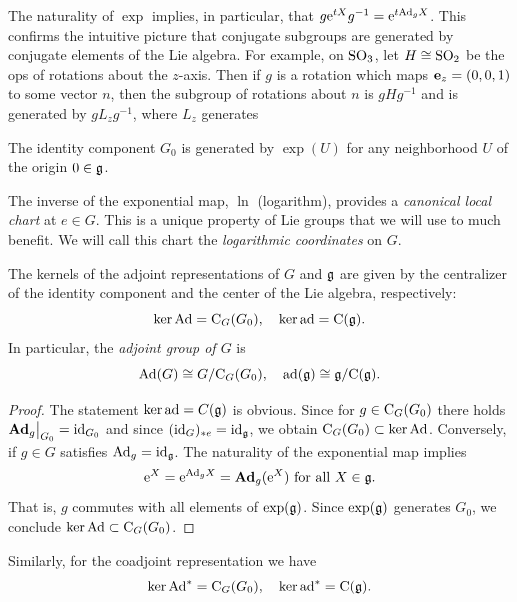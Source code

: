 \begin{rem}
    The naturality of $\exp$ implies, in particular, that $g\rme^{tX}g^{-1}=\rme^{t\Ad_g X}$. This confirms the intuitive picture that conjugate subgroups are generated by conjugate elements of the Lie algebra. For example, on $\SO_3$, let $H\cong\SO_2$ be the \gls{ops} of rotations about the $z$-axis. Then if $g$ is a rotation which maps $\bf{e}_z=(0,0,1)$ to some vector $n$, then the subgroup of rotations about $n$ is $gHg^{-1}$ and is generated by $gL_z g^{-1}$, where $L_z$ generates 
\end{rem}
\begin{cor}
    The identity component $G_0$ is generated by $\exp(U)$ for any neighborhood $U$ of the origin $0\in\frakg$.
\end{cor}
 

\begin{rem}
    The inverse of the exponential map, $\ln$ (logarithm), provides a \emph{canonical local chart} at $e\in G$. This is a unique property of Lie groups that we will use to much benefit. We will call this chart the \emph{logarithmic coordinates} on $G$.
\end{rem}


\begin{prop}\label{prop 5.4.5 RS1 ker(Ad) and ker(ad)}
    The kernels of the adjoint representations of $G$ and $\frakg$ are given by the centralizer of the identity component and the center of the Lie algebra, respectively:
    \[\ker \Ad=\rmC_G(G_0),\quad \ker \ad=\rmC(\frakg).\]
    In particular, the \emph{adjoint group of $G$} is 
    \[\Ad(G)\cong G\slash \rmC_G(G_0),\quad \ad(\frakg)\cong \frakg\slash \rmC(\frakg).\]
\end{prop}
\begin{proof}
    The statement $\ker\ad=C(\frakg)$ is obvious. Since for $g\in \rmC_G(G_0)$ there holds $\restr{\Adg_g}{G_0}=\id_{G_0}$ and since $(\id_G)_{\ast e}=\id_\frakg$, we obtain $\rmC_G(G_0)\subset \ker\Ad$. Conversely, if $g\in G$ satisfies $\Ad_g=\id_\frakg$. The naturality of the exponential map implies 
    \[\rme^X=\rme^{\Ad_g X}=\Adg_g(\rme^X)\text{ for all }X\in\frakg.\]
    That is, $g$ commutes with all elements of $\exp(\frakg)$. Since $\exp(\frakg)$ generates $G_0$, we conclude $\ker\Ad\subset \rmC_G(G_0)$.
\end{proof}

Similarly, for the coadjoint representation we have
\[\ker \Ad^\ast=\rmC_G(G_0),\quad \ker\ad^\ast=\rmC(\frakg).\]

